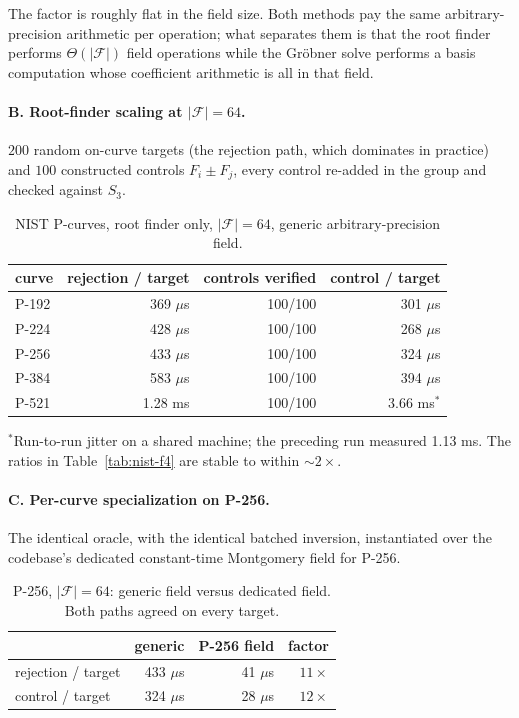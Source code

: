 \documentclass[10pt,a4paper]{article}
\theoremstyle{remark}
\newcommand{\Fb}{\mathcal{F}}
\newcommand{\Sem}[1]{S_{#1}}
\newcommand{\abs}[1]{\lvert #1 \rvert}
\begin{document}
The factor is roughly flat in the field size. Both methods pay the same
arbitrary-precision arithmetic per operation; what separates them is
that the root finder performs $\Theta(\abs{\Fb})$ field operations
while the Gr\"obner solve performs a basis computation whose
coefficient arithmetic is all in that field.

\paragraph{B. Root-finder scaling at $\abs{\Fb} = 64$.} $200$ random
on-curve targets (the rejection path, which dominates in practice) and
$100$ constructed controls $F_i \pm F_j$, every control re-added in the
group and checked against $\Sem{3}$.

\begin{table}[h]
\centering
\caption{NIST P-curves, root finder only, $\abs{\Fb}=64$, generic
arbitrary-precision field.}
\label{tab:nist-scale}
\begin{tabular}{@{}lrrr@{}}
\toprule
curve & rejection / target & controls verified & control / target \\
\midrule
P-192 & 369 $\mu$s & 100/100 & 301 $\mu$s \\
P-224 & 428 $\mu$s & 100/100 & 268 $\mu$s \\
P-256 & 433 $\mu$s & 100/100 & 324 $\mu$s \\
P-384 & 583 $\mu$s & 100/100 & 394 $\mu$s \\
P-521 & 1.28 ms    & 100/100 & 3.66 ms$^{*}$ \\
\bottomrule
\end{tabular}

\smallskip
{\footnotesize $^{*}$Run-to-run jitter on a shared machine; the
preceding run measured 1.13 ms. The ratios in Table~\ref{tab:nist-f4}
are stable to within $\sim 2\times$.}
\end{table}

\paragraph{C. Per-curve specialization on P-256.} The identical oracle,
with the identical batched inversion, instantiated over the codebase's
dedicated constant-time Montgomery field for P-256.

\begin{table}[H]
\centering
\caption{P-256, $\abs{\Fb}=64$: generic field versus dedicated field.
Both paths agreed on every target.}
\label{tab:nist-special}
\begin{tabular}{@{}lrrr@{}}
\toprule
 & generic & P-256 field & factor \\
\midrule
rejection / target & 433 $\mu$s & 41 $\mu$s & $11\times$ \\
control / target   & 324 $\mu$s & 28 $\mu$s & $12\times$ \\
\bottomrule
\end{tabular}
\end{table}
\end{document}
